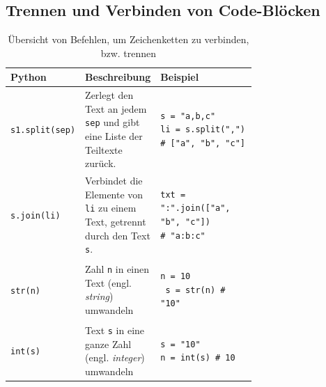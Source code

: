  \subsection{Trennen und Verbinden von Code-Blöcken}
 \begin{table}[H]
 \centering
 \begin{tabular}{l|p{0.3\linewidth}|p{0.4\linewidth}}
 \textbf{Python} & \textbf{Beschreibung} & \textbf{Beispiel} \\\midrule\midrule
 
 \lstinline|s1.split(sep)| & Zerlegt den Text an jedem \texttt{sep} und gibt eine Liste der Teiltexte zurück.  & \begin{minipage}{\linewidth}
 \begin{lstlisting}[numbers=none]
s = "a,b,c"
li = s.split(",") 
# ["a", "b", "c"]
\end{lstlisting}
 \end{minipage}\\\midrule
  \lstinline|s.join(li)| & Verbindet die Elemente von \texttt{li} zu einem Text, getrennt durch den Text \texttt{s}.  & \begin{minipage}{\linewidth}
  \begin{lstlisting}[numbers=none]
txt = ":".join(["a", "b", "c"]) 
# "a:b:c"
\end{lstlisting}
  \end{minipage}\\\midrule
   \lstinline|str(n)| & Zahl \texttt{n} in einen Text (engl. \textit{string}) umwandeln  & \begin{minipage}{\linewidth}
   \begin{lstlisting}[numbers=none]
 n = 10
 s = str(n) # "10"
\end{lstlisting}
   \end{minipage}\\\midrule
    \lstinline|int(s)| & Text \texttt{s} in eine ganze Zahl (engl. \textit{integer}) umwandeln  & \begin{minipage}{\linewidth}
    \begin{lstlisting}[numbers=none]
s = "10"
n = int(s) # 10
\end{lstlisting}
    \end{minipage}
 \end{tabular}
 \caption{Übersicht von Befehlen, um Zeichenketten zu verbinden, bzw. trennen}
 \label{tab:string-sep-merge}
 \end{table}
